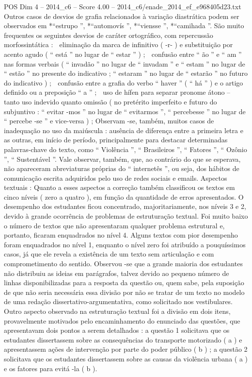 \begin{textsample}{POS Dim 4 – 2014\_c6 – Score 4.00 – 2014\_c6/enade\_2014\_ef\_e968405d23.txt}
Outros casos de desvios de grafia relacionados à variação diastrática podem ser observados em *“estrupo ”, *“automovís ”, *“viensse ”, *“camihada ”.
São muito frequentes os seguintes desvios de caráter ortográfico, com repercussão morfossintática :  eliminação da marca de infinitivo ( -r- ) e substituição por acento agudo ( “ está ” no lugar de “ estar ” ) ;  confusão entre “ ão ” e “ am ” nas formas verbais ( “ invadão ” no lugar de “ invadam ” e “ estam ” no lugar de “ estão ” no presente do indicativo ; “ estaram ” no lugar de “ estarão ” no futuro do indicativo ) ;  confusão entre a grafia do verbo “ haver ” ( “ há ” ) e o artigo definido ou a preposição “ a ” ;  uso de hífen para separar pronome átono – tanto uso indevido quanto omissão ( no pretérito imperfeito e futuro do subjuntivo : “ evitar -mos ” no lugar de “ evitarmos ”, “ percebesse ” no lugar de “ percebe -se ” e vice-versa ) ; Observam -se, também, muitos casos de inadequação no uso da maiúscula : ausência de diferença entre a primeira letra e as outras, em início de período, principalmente para destacar determinadas palavras-chave do texto, como “ Violência ”, “ Brasileiros ”, “ Fatores ”, “ Ozônio ”, “ Sustentável ”.
Vale observar, também, que, ao contrário do que se esperava, não apareceram abreviaturas próprias do “ internetês ”, ou seja, dos hábitos de comunicação escrita adquiridos pelo uso de redes sociais e emails.
Aspectos textuais : Quanto a esses aspectos a correção também classificou os textos em cinco níveis ( zero a quatro ), em função da quantidade de erros apresentados.
O desempenho dos estudantes ficou concentrado, majoritariamente, nos níveis 3 e 2, devido à grande ocorrência de problemas de estruturação textual.
Foi muito baixo o número de textos que não apresentaram qualquer problema estrutural e, portanto, ficaram enquadrados no nível 4.
Alguns textos com pior desempenho foram enquadrados no nível 1, enquanto o nível zero foi atribuído a pouquíssimos casos, já que ele revela a existência de um texto sem articulação e com comprometimento do sentido.
Observou -se que a grande maioria dos estudantes não distribuiu as ideias em parágrafos, talvez devido ao pequeno número de linhas disponibilizadas para a resposta da questão ou, quem sabe, pela suposição de que não seria necessária essa divisão por não se tratar de um texto no modelo de uma redação dissertativo-argumentativa, como solicitado nos vestibulares.
Outro aspecto observado na estruturação textual foi a divisão em dois itens, provavelmente motivados pelo encaminhamento do enunciado das questões, que apresentavam dois pontos a serem detalhados : a questão 1 solicitava que os estudantes dissertassem sobre as consequências do transporte motorizado ( a ) e apresentassem ações de intervenção por parte do poder público ( b ) ; a questão 2 solicitava que os estudantes dissertassem sobre as causas da violência urbana ( a ) e os fatores para evitá -la ( b ).

\end{textsample}
